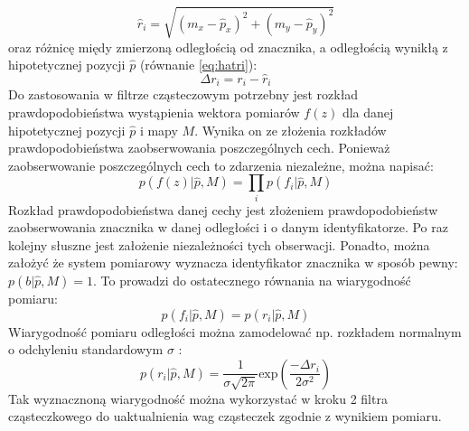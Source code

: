 \begin{equation}
 \label{eq:hatri}
 \hat r_i = \sqrt{(m_x - \hat p_x)^2 + (m_y - \hat p_y)^2}
\end{equation}
oraz różnicę międy zmierzoną odległością od znacznika, a odległością wynikłą z hipotetycznej pozycji $\hat p$ (równanie \ref{eq:hatri}):
\begin{equation}
\Delta r_i = r_i - \hat r_i 
\end{equation}
Do zastosowania w filtrze cząsteczowym potrzebny jest rozkład prawdopodobieństwa wystąpienia wektora pomiarów $f(z)$ dla danej hipotetycznej pozycji $\hat p$ i mapy $M$. Wynika on ze złożenia rozkładów prawdopodobieństwa zaobserwowania poszczególnych cech. Ponieważ zaobserwowanie poszczególnych cech to zdarzenia niezależne, można napisać:
\begin{equation}
 p(f(z) | \hat p, M) = \prod_i p(f_i | \hat p, M)
\end{equation}
Rozkład prawdopodobieństwa danej cechy jest złożeniem prawdopodobieństw zaobserwowania znacznika w danej odległości i o danym identyfikatorze. Po raz kolejny słuszne jest założenie niezależności tych obserwacji. Ponadto, można założyć że system pomiarowy wyznacza identyfikator znacznika w sposób pewny: $p(b | \hat p, M) = 1$. To prowadzi do ostatecznego równania na wiarygodność pomiaru:
\begin{equation}
p(f_i | \hat p, M) = p(r_i | \hat p, M)
\end{equation}
Wiarygodność pomiaru odległości można zamodelować np. rozkładem normalnym o odchyleniu standardowym $\sigma$ :
\begin{equation}
 p(r_i | \hat p, M) = \frac{1}{\sigma \sqrt{2\pi}} \mathrm{exp} \left( \frac{- \Delta r_i}{2\sigma^2} \right)
\end{equation}
Tak wyznacznoną wiarygodność można wykorzystać w kroku 2 filtra cząsteczkowego do uaktualnienia wag cząsteczek zgodnie z wynikiem pomiaru. 



